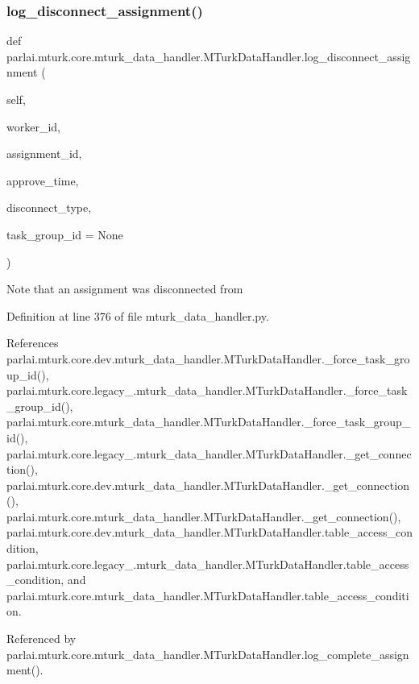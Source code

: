\subsubsection{\texorpdfstring{log\+\_\+disconnect\+\_\+assignment()}{log\_disconnect\_assignment()}}
{\footnotesize\ttfamily def parlai.\+mturk.\+core.\+mturk\+\_\+data\+\_\+handler.\+M\+Turk\+Data\+Handler.\+log\+\_\+disconnect\+\_\+assignment (\begin{DoxyParamCaption}\item[{}]{self,  }\item[{}]{worker\+\_\+id,  }\item[{}]{assignment\+\_\+id,  }\item[{}]{approve\+\_\+time,  }\item[{}]{disconnect\+\_\+type,  }\item[{}]{task\+\_\+group\+\_\+id = {\ttfamily None} }\end{DoxyParamCaption})}

\begin{DoxyVerb}Note that an assignment was disconnected from\end{DoxyVerb}
 

Definition at line 376 of file mturk\+\_\+data\+\_\+handler.\+py.



References parlai.\+mturk.\+core.\+dev.\+mturk\+\_\+data\+\_\+handler.\+M\+Turk\+Data\+Handler.\+\_\+force\+\_\+task\+\_\+group\+\_\+id(), parlai.\+mturk.\+core.\+legacy\+\_.\+mturk\+\_\+data\+\_\+handler.\+M\+Turk\+Data\+Handler.\+\_\+force\+\_\+task\+\_\+group\+\_\+id(), parlai.\+mturk.\+core.\+mturk\+\_\+data\+\_\+handler.\+M\+Turk\+Data\+Handler.\+\_\+force\+\_\+task\+\_\+group\+\_\+id(), parlai.\+mturk.\+core.\+legacy\+\_.\+mturk\+\_\+data\+\_\+handler.\+M\+Turk\+Data\+Handler.\+\_\+get\+\_\+connection(), parlai.\+mturk.\+core.\+dev.\+mturk\+\_\+data\+\_\+handler.\+M\+Turk\+Data\+Handler.\+\_\+get\+\_\+connection(), parlai.\+mturk.\+core.\+mturk\+\_\+data\+\_\+handler.\+M\+Turk\+Data\+Handler.\+\_\+get\+\_\+connection(), parlai.\+mturk.\+core.\+dev.\+mturk\+\_\+data\+\_\+handler.\+M\+Turk\+Data\+Handler.\+table\+\_\+access\+\_\+condition, parlai.\+mturk.\+core.\+legacy\+\_.\+mturk\+\_\+data\+\_\+handler.\+M\+Turk\+Data\+Handler.\+table\+\_\+access\+\_\+condition, and parlai.\+mturk.\+core.\+mturk\+\_\+data\+\_\+handler.\+M\+Turk\+Data\+Handler.\+table\+\_\+access\+\_\+condition.



Referenced by parlai.\+mturk.\+core.\+mturk\+\_\+data\+\_\+handler.\+M\+Turk\+Data\+Handler.\+log\+\_\+complete\+\_\+assignment().


